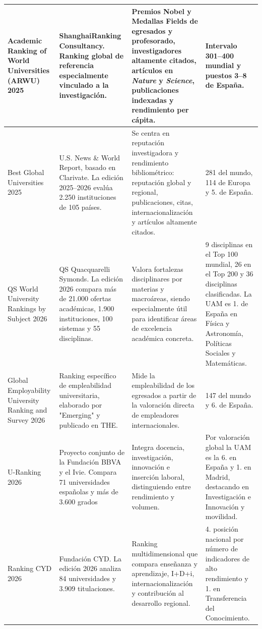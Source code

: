 \documentclass[
  11pt,
  a4paper,
  twoside]{scrreprt}
\begin{document}
\begin{landscape}
\begin{longtable}{p{3cm} p{5cm} p{8cm} p{6cm}}
Academic Ranking of World Universities (ARWU) 2025
&
ShanghaiRanking Consultancy. Ranking global de referencia especialmente vinculado a la investigación.
&
Premios Nobel y Medallas Fields de egresados y profesorado, investigadores altamente citados, artículos en \textit{Nature} y \textit{Science}, publicaciones indexadas y rendimiento per cápita.
&
Intervalo 301--400 mundial y puestos 3--8 de España.
\\
\hline

Best Global Universities 2025
&
U.S. News \& World Report, basado en Clarivate. La edición 2025--2026 evalúa 2.250 instituciones de 105 países.
&
Se centra en reputación investigadora y rendimiento bibliométrico: reputación global y regional, publicaciones, citas, internacionalización y artículos altamente citados.
&
281 del mundo, 114 de Europa y 5.\textordfeminine{} de España.
\\
\hline

QS World University Rankings by Subject 2026
&
QS Quacquarelli Symonds. La edición 2026 compara más de 21.000 ofertas académicas, 1.900 instituciones, 100 sistemas y 55 disciplinas.
&
Valora fortalezas disciplinares por materias y macroáreas, siendo especialmente útil para identificar áreas de excelencia académica concreta.
&
9 disciplinas en el Top 100 mundial, 26 en el Top 200 y 36 disciplinas clasificadas. La UAM es 1.\textordfeminine{} de España en Física y Astronomía, Políticas Sociales y Matemáticas.
\\
\hline

Global Employability University Ranking and Survey 2026
&
Ranking específico de empleabilidad universitaria, elaborado por "Emerging" y publicado en THE.
&
Mide la empleabilidad de los egresados a partir de la valoración directa de empleadores internacionales.
&
147 del mundo y 6.\textordfeminine{} de España.
\\
\hline

U-Ranking 2026
&
Proyecto conjunto de la Fundación BBVA y el Ivie. Compara 71 universidades españolas y más de 3.600 grados
&
Integra docencia, investigación, innovación e inserción laboral, distinguiendo entre rendimiento y volumen.
&
Por valoración global la UAM es la 6.\textordfeminine{} en España y 1.\textordfeminine{} en Madrid, destacando en Investigación e Innovación y movilidad.
\\
\hline

Ranking CYD 2026
&
Fundación CYD. La edición 2026 analiza 84 universidades y 3.909 titulaciones.
&
Ranking multidimensional que compara enseñanza y aprendizaje, I+D+i, internacionalización y contribución al desarrollo regional. 
&
4.\textordfeminine{} posición nacional por número de indicadores de alto rendimiento y 1.\textordfeminine{} en Transferencia del Conocimiento.
\\
\hline


\end{longtable}
\end{landscape}
\end{document}
